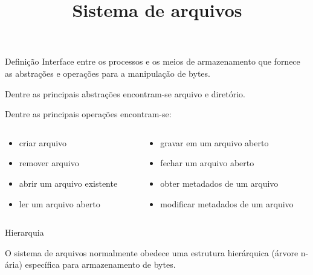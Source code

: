 
\title{Sistema de arquivos}
\frame{\maketitle}

\begin{frame}{\inserttitle}{Definição}
  \small
  Interface entre os processos e os meios de armazenamento que fornece
  as abstrações e operações para a manipulação de bytes.
  
  \bigskip
  Dentre as principais abstrações encontram-se \alert{arquivo} e
  \alert{diretório}.\bigskip
  
  \pause
  Dentre as principais operações encontram-se:
  \begin{columns}
    \begin{column}{.4\textwidth}
      \begin{itemize}
      \item criar arquivo
      \item remover arquivo
      \item abrir um arquivo existente
      \item ler um arquivo aberto
      \end{itemize}
    \end{column}
    \begin{column}{.6\textwidth}
      \begin{itemize}
      \item gravar em um arquivo aberto
      \item fechar um arquivo aberto
      \item obter metadados de um arquivo
      \item modificar metadados de um arquivo
      \end{itemize}
    \end{column}
  \end{columns}

\end{frame}


\begin{frame}{\inserttitle}{Hierarquia}
  
  O sistema de arquivos normalmente obedece uma \alert{estrutura
    hierárquica} (árvore n-ária) específica para armazenamento de
  bytes.

\bigskip
\begin{center}
\end{center}

\end{frame}

